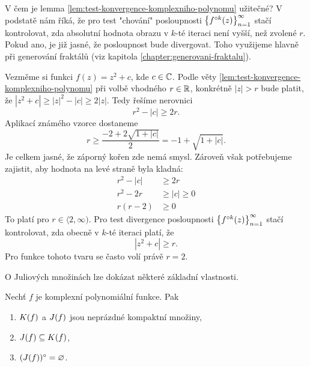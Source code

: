 V čem je lemma \ref{lem:test-konvergence-komplexniho-polynomu} užitečné? V podstatě nám říká, že pro test "chování" posloupnosti $\left\{f^{\circ k}(z)\right\}_{n=1}^\infty$ stačí kontrolovat, zda absolutní hodnota obrazu v $k$-té iteraci není vyšší, než zvolené $r$. Pokud ano, je již jasné, že posloupnost bude divergovat. Toho využijeme hlavně při generování fraktálů (viz kapitola \ref{chapter:generovani-fraktalu}).
\begin{example}
    Vezměme si funkci $f(z)=z^2+c$, kde $c\in\mathbb{C}$. Podle věty \ref{lem:test-konvergence-komplexniho-polynomu} při volbě vhodného $r\in\mathbb{R}$, konkrétně $|z|>r$ bude platit, že $|z^2+c|\geqslant|z|^2-|c|\geqslant 2|z|$. Tedy řešíme nerovnici
    \[r^2-|c|\geqslant 2r.\]
    Aplikací známého vzorce dostaneme
    \[r\geqslant\frac{-2+2\sqrt{1+|c|}}{2}=-1+\sqrt{1+|c|}.\]
    Je celkem jasné, že záporný kořen zde nemá smysl. Zároveň však potřebujeme zajistit, aby hodnota na levé straně byla kladná:
    \begin{align*}
        r^2-|c|&\geqslant 2r\\
        r^2-2r&\geqslant|c|\geqslant 0\\
        r(r-2)&\geqslant 0
    \end{align*}
    To platí pro $r\in\langle 2,\infty)$. Pro test divergence posloupnosti $\left\{f^{\circ k}(z)\right\}_{n=1}^\infty$ stačí kontrolovat, zda obecně v $k$-té iteraci platí, že
    \[|z^2+c|\geqslant r.\]
    Pro funkce tohoto tvaru se často volí právě $r=2$.
\end{example}
O Juliových množinách lze dokázat některé základní vlastnosti.
\begin{theorem}\label{thm:vztah-kf-a-jf}
    Nechť $f$ je komplexní polynomiální funkce. Pak
    \begin{enumerate}[label=(\roman*)]
        \item\label{thm:kompaktnost-kf-jf} $K(f)$ a $J(f)$ jsou neprázdné kompaktní množiny,
        \item\label{thm:jf-podmnozina-kf} $J(f)\subseteq K(f)$,
        \item\label{thm:vnitrek-jf-neprazdny} $(J(f))^\circ=\varnothing$.
    \end{enumerate}
\end{theorem}
